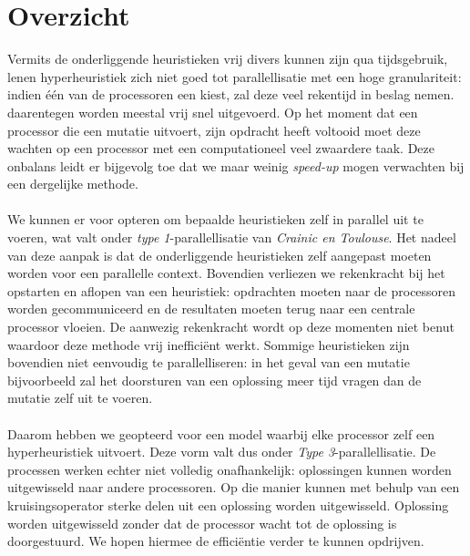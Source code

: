 \section{Overzicht}

Vermits de onderliggende heuristieken vrij divers kunnen zijn qua tijdsgebruik, lenen hyperheuristiek zich niet goed tot parallellisatie met een hoge granulariteit: indien \'e\'en van de processoren een \abls{} \abh{} kiest, zal deze veel rekentijd in beslag nemen. \abmt[M]{} \abhn{} daarentegen worden meestal vrij snel uitgevoerd. Op het moment dat een processor die een mutatie uitvoert, zijn opdracht heeft voltooid moet deze wachten op een processor met een computationeel veel zwaardere taak. Deze onbalans leidt er bijgevolg toe dat we maar weinig \emph{speed-up} mogen verwachten bij een dergelijke methode.

\paragraph{}
We kunnen er voor opteren om bepaalde heuristieken zelf in parallel uit te voeren, wat valt onder \emph{type 1}-parallellisatie van \emph{Crainic en Toulouse}\cite{crainicAndToulouse}. Het nadeel van deze aanpak is dat de onderliggende heuristieken zelf aangepast moeten worden voor een parallelle context. Bovendien verliezen we rekenkracht bij het opstarten en aflopen van een heuristiek: opdrachten moeten naar de processoren worden gecommuniceerd en de resultaten moeten terug naar een centrale processor vloeien. De aanwezig rekenkracht wordt op deze momenten niet benut waardoor deze methode vrij ineffici\"ent werkt. Sommige heuristieken zijn bovendien niet eenvoudig te parallelliseren: in het geval van een mutatie bijvoorbeeld zal het doorsturen van een oplossing meer tijd vragen dan de mutatie zelf uit te voeren.

\paragraph{}
Daarom hebben we geopteerd voor een model waarbij elke processor zelf een hyperheuristiek uitvoert. Deze vorm valt dus onder \emph{Type 3}-parallellisatie. De processen werken echter niet volledig onafhankelijk: oplossingen kunnen worden uitgewisseld naar andere processoren. Op die manier kunnen met behulp van een kruisingsoperator sterke delen uit een oplossing worden uitgewisseld. Oplossing worden uitgewisseld zonder dat de processor wacht tot de oplossing is doorgestuurd. We hopen hiermee de effici\"entie verder te kunnen opdrijven.

